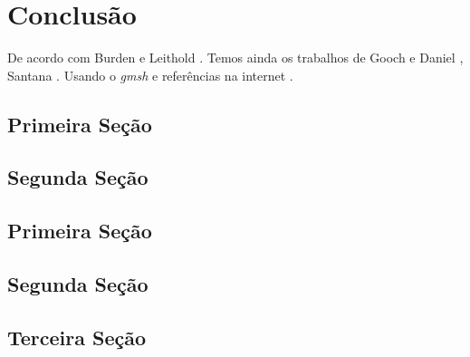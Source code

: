 \chapter{Conclusão}

\lipsum[1-2]


De acordo com Burden \cite{burden} e Leithold \cite{leithold}. 
Temos ainda os trabalhos de Gooch e Daniel \cite{gooch,daniel}, 
Santana \cite{santana}. Usando o \emph{gmsh} \cite{gmsh} e 
referências na internet \cite{wiki:quadrature}.

\section{Primeira Seção}

\lipsum[3-4]


\section{Segunda Seção}

\lipsum[5-6]


\section{Primeira Seção}

\lipsum[3-4]


\section{Segunda Seção}

\lipsum[5-6]


\section{Terceira Seção}

